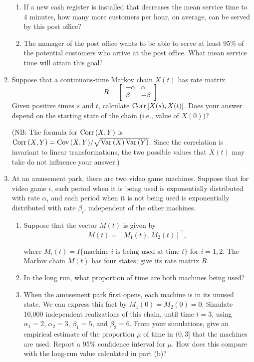 \documentclass{article}
\def\Var{\mathop{\rm Var\,}\nolimits}
\def\Cov{\mathop{\rm Cov\,}\nolimits}
\def\Corr{\mathop{\rm Corr\,}\nolimits}
\begin{document}
\begin{enumerate}
\begin{enumerate}
    \item If a new cash register is installed that decreases the mean service
    time to 4 minutes, how many more customers per hour, on average, can be
    served by this post office?
    
    \item The manager of the post office wants to be able to serve at least 95\%
    of the potential customers who arrive at the post office. What mean service
    time will attain this goal?
    
    \end{enumerate}
    
  \item Suppose that a continuous-time Markov chain $X(t)$ has rate matrix
  \[
  R = \begin{bmatrix}
  -\alpha & \alpha \\
  \beta & -\beta
  \end{bmatrix}.  
  \]  
  Given positive times $s$ and $t$, calculate $\Corr[X(s), X(t)]$. Does your
  answer depend on the starting state of the chain (i.e., value of $X(0)$)?
  
  (NB: The formula for $\Corr(X,Y)$ is
  $\Corr(X,Y) = \Cov(X,Y)/\sqrt{\Var(X)\Var(Y)}$.
  Since the correlation is invariant to linear transformations, the two
  possible values that $X(t)$ may take do not influence your answer.)
  
  \item At an amusement park, there are two video game machines. Suppose that
  for video game $i$, each period when it is being used is exponentially
  distributed with rate $\alpha_i$ and each period when it is not being used is
  exponentially distributed with rate $\beta_i$, independent of the other
  machines.
  
    \begin{enumerate}

    \item Suppose that the vector $M(t)$ is given by
    \[
    M(t) = [ M_1(t), M_2(t) ] ^\top,
    \]
    
    where $M_i(t)=I\{\mbox{machine $i$ is being used at time $t$}\}$ for $i=1,
    2$. The Markov chain $M(t)$ has four states; give its rate matrix $R$.
    
    \item In the long run, what proportion of time are both machines being used?
    
    \item When the amusement park first opens, each machine is in its unused
    state. We can express this fact by $M_1(0)=M_2(0)=0$. Simulate 10,000
    independent realizations of this chain, until time $t=3$, using
    $\alpha_1=2$, $\alpha_2=3$, $\beta_1=5$, and $\beta_2=6$. From your
    simulations, give an empirical estimate of the proportion $\mu$ of time in
    $(0, 3]$ that the machines are used. Report a 95\% confidence interval for
    $\mu$. How does this compare with the long-run value calculated in part (b)?
    

\end{enumerate}
\end{enumerate}
\end{document}

